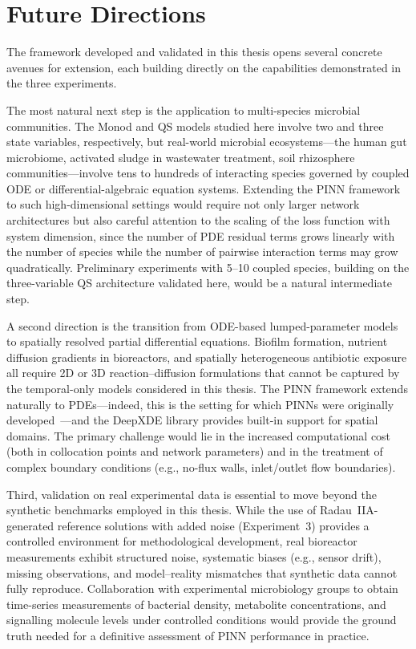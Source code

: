 \documentclass[14pt,a4paper,openany]{extbook}
\begin{document}
\section{Future Directions}
\label{sec:future}

The framework developed and validated in this thesis opens several concrete avenues for extension, each building directly on the capabilities demonstrated in the three experiments.

The most natural next step is the application to multi-species microbial communities. The Monod and QS models studied here involve two and three state variables, respectively, but real-world microbial ecosystems---the human gut microbiome, activated sludge in wastewater treatment, soil rhizosphere communities---involve tens to hundreds of interacting species governed by coupled ODE or differential-algebraic equation systems. Extending the PINN framework to such high-dimensional settings would require not only larger network architectures but also careful attention to the scaling of the loss function with system dimension, since the number of PDE residual terms grows linearly with the number of species while the number of pairwise interaction terms may grow quadratically. Preliminary experiments with 5--10 coupled species, building on the three-variable QS architecture validated here, would be a natural intermediate step.

A second direction is the transition from ODE-based lumped-parameter models to spatially resolved partial differential equations. Biofilm formation, nutrient diffusion gradients in bioreactors, and spatially heterogeneous antibiotic exposure all require 2D or 3D reaction--diffusion formulations that cannot be captured by the temporal-only models considered in this thesis. The PINN framework extends naturally to PDEs---indeed, this is the setting for which PINNs were originally developed~\cite{raissi2019}---and the DeepXDE library provides built-in support for spatial domains. The primary challenge would lie in the increased computational cost (both in collocation points and network parameters) and in the treatment of complex boundary conditions (e.g., no-flux walls, inlet/outlet flow boundaries).

Third, validation on real experimental data is essential to move beyond the synthetic benchmarks employed in this thesis. While the use of Radau~IIA-generated reference solutions with added noise (Experiment~3) provides a controlled environment for methodological development, real bioreactor measurements exhibit structured noise, systematic biases (e.g., sensor drift), missing observations, and model--reality mismatches that synthetic data cannot fully reproduce. Collaboration with experimental microbiology groups to obtain time-series measurements of bacterial density, metabolite concentrations, and signalling molecule levels under controlled conditions would provide the ground truth needed for a definitive assessment of PINN performance in practice.
\end{document}
